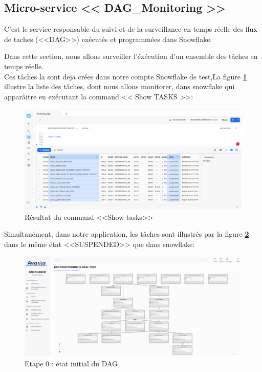 \subsection{Micro-service << DAG\_Monitoring >>}
\par C'est le service responsable du suivi et de la surveillance en temps réelle des flux de taches (<<DAG>>) exécutés et programmées dans Snowflake. 
\par Dans cette section, nous allons surveiller l'éxécution d'un ensemble des tâches en temps réelle. 
\\ Ces tâches la sont deja crées dans notre compte Snowflake de test,La figure \textbf{\ref{fig:show}} illustre la liste des tâches, dont nous allons monitorer, dans snowflake qui apparâitre en exécutant la command << Show TASKS >>:
    \begin{figure}[H]
        \centering
        \includegraphics[width =1\linewidth]{img/captures/dag/show.PNG}
        \caption{Résultat du command <<Show tasks>> }
        \label{fig:show}
    \end{figure}
\par Simultanément, dans notre application, les tâches sont illustrés par la figure \textbf{\ref{fig:sus}} dans le même état <<SUSPENDED>> que dans snowflake:
    \begin{figure}[H]
        \centering
        \includegraphics[width =1\linewidth]{img/captures/dag/1/ok/0.png}
        \caption{Etape 0 : état initial du DAG}
        \label{fig:sus}
    \end{figure}
